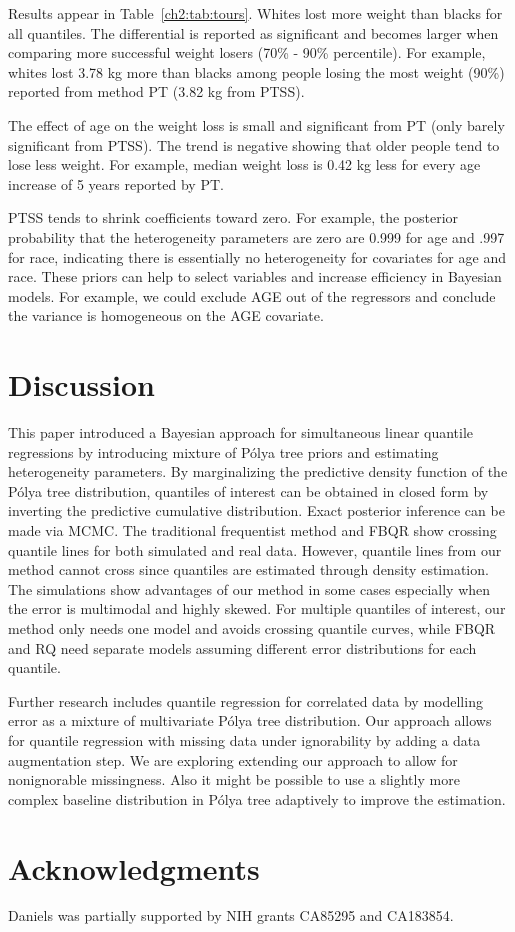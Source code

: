 \documentclass[12pt]{article}
\newcommand{\polya}{P\'{o}lya}
\begin{document}
Results appear in Table~\ref{ch2:tab:tours}.
Whites lost more weight than blacks for all quantiles.
The differential is reported as significant and becomes larger when comparing more successful weight losers (70\% - 90\% percentile).
For example, whites lost 3.78 kg more than blacks among people losing the most weight (90\%) reported from method PT (3.82 kg from PTSS).

The effect of age on the weight loss is small and significant from PT (only barely significant from PTSS).
The trend is negative showing that older people tend to lose less weight.
For example, median weight loss is 0.42 kg less for every age increase of 5 years reported by PT.

PTSS tends to shrink coefficients toward zero. For example, the
posterior probability that the heterogeneity parameters are zero are
0.999 for age and .997 for race, indicating there is essentially no
heterogeneity for covariates for age and race. These priors can help to select
variables and increase efficiency in Bayesian models. For example, we
could exclude AGE out of the regressors and conclude the variance is
homogeneous on the AGE covariate.


\section{Discussion}
\label{ch2:sec:discussion}
This paper introduced a Bayesian approach for simultaneous linear quantile regressions by introducing mixture of \polya{} tree priors and estimating heterogeneity parameters.
By marginalizing the predictive density function of the \polya{} tree distribution, quantiles of interest can be obtained in closed form by inverting the predictive cumulative distribution.
Exact posterior inference can be made via MCMC.
The traditional frequentist method and FBQR show crossing quantile lines for both simulated and real data.
However, quantile lines from our method cannot cross since quantiles are estimated through density estimation.
The simulations show advantages of our method in some cases especially when the error is multimodal and highly skewed.
For multiple quantiles of interest, our method only needs one model and avoids crossing quantile curves, while FBQR and RQ need separate models assuming different error distributions for each quantile.

Further research includes quantile regression for correlated data by modelling error as a mixture of multivariate \polya{} tree distribution.
Our approach allows for quantile regression with missing data under ignorability by adding a data augmentation step.
We are exploring extending our approach to allow for nonignorable missingness.
Also it might be possible to use a slightly more complex baseline distribution in \polya{} tree adaptively to improve the estimation.

\section*{Acknowledgments}
Daniels was partially supported by NIH grants CA85295 and CA183854.

 
\end{document}
